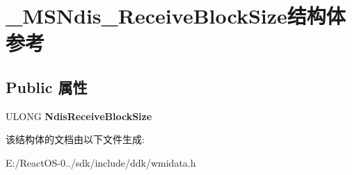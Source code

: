 \hypertarget{struct___m_s_ndis___receive_block_size}{}\section{\+\_\+\+M\+S\+Ndis\+\_\+\+Receive\+Block\+Size结构体 参考}
\label{struct___m_s_ndis___receive_block_size}
\subsection*{Public 属性}
\begin{DoxyCompactItemize}
\item 
\mbox{\label{struct___m_s_ndis___receive_block_size_a8223aa28e4e49e1d828d511f2a48262b}} 
U\+L\+O\+NG {\bfseries Ndis\+Receive\+Block\+Size}
\end{DoxyCompactItemize}


该结构体的文档由以下文件生成\+:\begin{DoxyCompactItemize}
\item 
E\+:/\+React\+O\+S-\/0../sdk/include/ddk/wmidata.\+h\end{DoxyCompactItemize}

